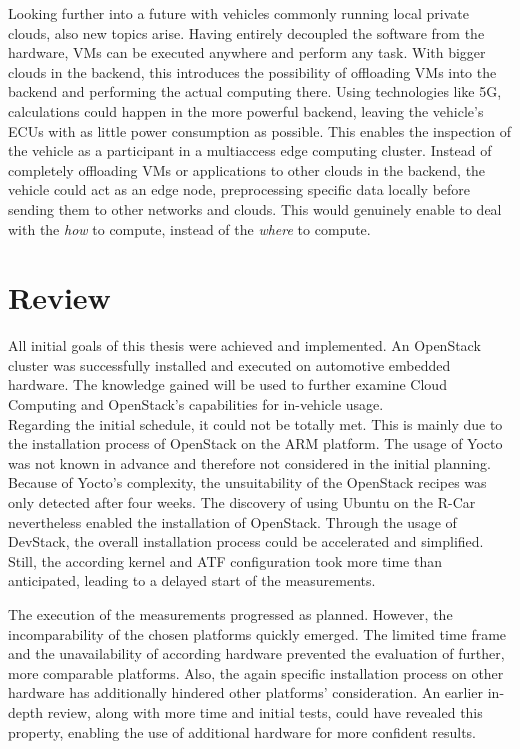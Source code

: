         \noindent Looking further into a future with vehicles commonly running local private clouds, also new topics arise.
        Having entirely decoupled the software from the hardware, VMs can be executed anywhere and perform any task.
        With bigger clouds in the backend, this introduces the possibility of offloading VMs into the backend and performing the actual computing there.
        Using technologies like 5G, calculations could happen in the more powerful backend, leaving the vehicle's ECUs with as little power consumption as possible.
        This enables the inspection of the vehicle as a participant in a multiaccess edge computing cluster.
        Instead of completely offloading VMs or applications to other clouds in the backend, the vehicle could act as an edge node, preprocessing specific data locally before sending them to other networks and clouds.
        This would genuinely enable to deal with the \textsl{how} to compute, instead of the \textsl{where} to compute.
        
        
    \section{Review}
    \label{section:review}
        
        All initial goals of this thesis were achieved and implemented.
        An OpenStack cluster was successfully installed and executed on automotive embedded hardware.
        The knowledge gained will be used to further examine Cloud Computing and OpenStack's capabilities for in-vehicle usage. \\
        Regarding the initial schedule, it could not be totally met.
        This is mainly due to the installation process of OpenStack on the ARM platform.
        The usage of Yocto was not known in advance and therefore not considered in the initial planning.
        Because of Yocto's complexity, the unsuitability of the OpenStack recipes was only detected after four weeks.
        The discovery of using Ubuntu on the R-Car nevertheless enabled the installation of OpenStack.
        Through the usage of DevStack, the overall installation process could be accelerated and simplified.
        Still, the according kernel and ATF configuration took more time than anticipated, leading to a delayed start of the measurements.
        
       \noindent The execution of the measurements progressed as planned.
       However, the incomparability of the chosen platforms quickly emerged. 
       The limited time frame and the unavailability of according hardware prevented the evaluation of further, more comparable platforms.
       Also, the again specific installation process on other hardware has additionally hindered other platforms' consideration. 
       An earlier in-depth review, along with more time and initial tests, could have revealed this property, enabling the use of additional hardware for more confident results.
       
        

        
        
        
        
        
        
        
        
        
        
        
        
        
        
        